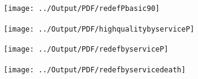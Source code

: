 \documentclass[12pt] {article}
\begin{document}
\pagebreak{}
\clearpage{}
\begin{table}
\caption{}
\label{Flo:alldeaths90}
\texttt{[image: ../Output/PDF/redefPbasic90]}
\end{table}

\pagebreak{}
\clearpage{}
\begin{table}
\caption{}
\label{Flo:Recruits by Service}\texttt{[image: ../Output/PDF/highqualitybyserviceP]}
\end{table}

\pagebreak{}
\clearpage{}
\begin{table}
\caption{}
\label{Flo:Death by Same-Service Other-Service}\texttt{[image: ../Output/PDF/redefbyserviceP]}
\end{table}

\clearpage{}
\pagebreak{}
\begin{table}
\caption{}
\label{Flo: Death by Service}\texttt{[image: ../Output/PDF/redefbyservicedeath]}
\end{table}
\end{document}
